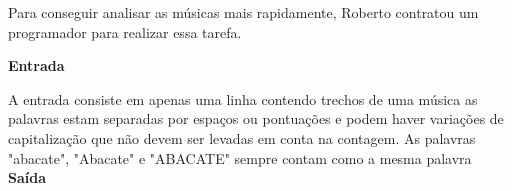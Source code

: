 \documentclass[a4paper, 12pt]{article}
\begin{document}
Para conseguir analisar as músicas mais rapidamente, Roberto contratou um programador para realizar essa tarefa.

\newline \newline
\textbf{{\large Entrada}} \newline

A entrada consiste em apenas uma linha contendo trechos de uma música as palavras estam separadas por espaços ou pontuações e podem haver variações de capitalização que não devem ser levadas em conta na contagem. As palavras "abacate", "Abacate" e "ABACATE" sempre contam como a mesma palavra
\newline \newline
\textbf{{\large Saída}} \newline
\end{document}
